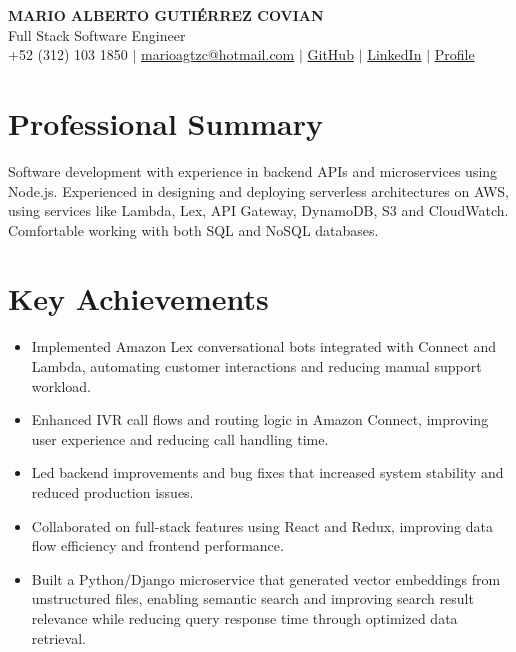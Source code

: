 \documentclass[10pt,letterpaper]{article}
\begin{document}
\begin{center}
    {\Large \bfseries \color{darkgray} MARIO ALBERTO GUTIÉRREZ COVIAN}\\[2pt]
    {Full Stack Software Engineer}\\[4pt]
    \small
    +52 (312) 103 1850 \;$\vert$\;
    \href{mailto:marioagtzc@hotmail.com}{marioagtzc@hotmail.com} \;$\vert$\;
    \href{https://github.com/MarioAGtzC}{GitHub} \;$\vert$\;
    \href{https://www.linkedin.com/in/marioagtz/}{LinkedIn} \;$\vert$\;
    \href{https://mario-gutierrez.com/}{Profile}
\end{center}

\section*{Professional Summary}
Software development with experience in backend APIs and microservices using Node.js. Experienced in designing and deploying serverless architectures on AWS, using services like Lambda, Lex, API Gateway, DynamoDB, S3 and CloudWatch. Comfortable working with both SQL and NoSQL databases.

\section*{Key Achievements}
\begin{itemize}
    \item Implemented Amazon Lex conversational bots integrated with Connect and Lambda, automating customer interactions and reducing manual support workload.
    \item Enhanced IVR call flows and routing logic in Amazon Connect, improving user experience and reducing call handling time.
    \item Led backend improvements and bug fixes that increased system stability and reduced production issues.
    \item Collaborated on full-stack features using React and Redux, improving data flow efficiency and frontend performance.
    \item Built a Python/Django microservice that generated vector embeddings from unstructured files, enabling semantic search and improving search result relevance while reducing query response time through optimized data retrieval.
\end{itemize}
\end{document}
